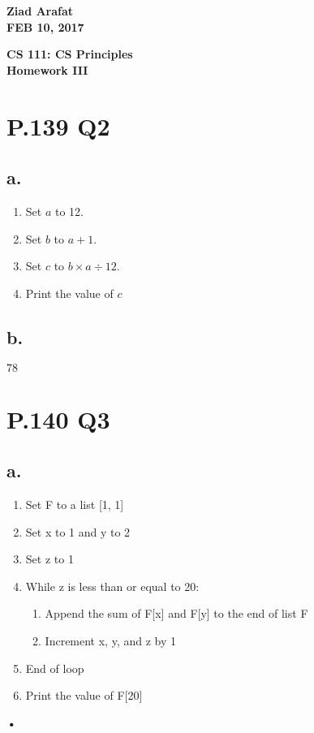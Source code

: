 \documentclass{article}%
\begin{document}
\begin{flushright}
\textbf{Ziad Arafat \\
FEB 10, 2017}
\end{flushright}

\begin{center}
\textbf{CS 111: CS Principles \\
Homework III} \\
\end{center}

\section{P.139 Q2}
\subsection{a.}
\begin{enumerate}
\item Set $a$ to 12.
\item Set $b$ to $a+1$.
\item Set $c$ to $b \times a \div 12$.
\item Print the value of $c$
\end{enumerate}

\subsection{b.}
$78$

\section{P.140 Q3}

\subsection{a.}
\begin{enumerate}
\item Set F to a list [1, 1]
\item Set x to 1 and y to 2
\item Set z to 1
\item While z is less than or equal to 20:
\begin{enumerate}
\item Append the sum of F[x] and F[y] to the end of list F
\item Increment x, y, and z by 1
\end{enumerate}
\item End of loop
\item Print the value of F[20]
\end{enumerate}\textbf{•}
\end{document}
